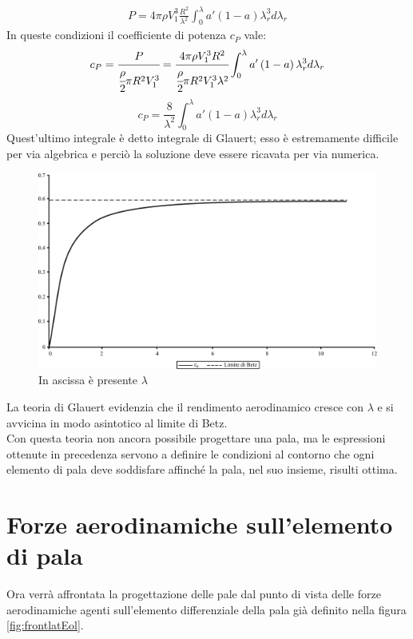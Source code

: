 \begin{align*}
P = 4 \pi \rho V_1^3 \frac{R^2}{\lambda^2} \int_0^{\lambda} a' \left( 1 - a \right) \lambda_r^3 d \lambda_r
\end{align*}
In queste condizioni il coefficiente di potenza $c_P$ vale:
\begin{align*}
c_P = \cfrac{P}{\cfrac{\rho}{2} \pi R^2 V_1^3} = \cfrac{4 \pi \rho V_1^3 R^2}{\cfrac{\rho}{2} \pi R^2  V_1^3 \lambda^2} \int_0^{\lambda} a' \left(1 - a \right) \lambda_r^3 d \lambda_r
\end{align*}
\begin{equation}
c_P = \frac{8}{\lambda^2} \int_0^{\lambda} a' \left( 1 - a \right) \lambda_r^3 d \lambda_r
\end{equation}
Quest'ultimo integrale è detto integrale di Glauert; esso è estremamente difficile per via algebrica e perciò la soluzione deve essere ricavata per via numerica.
\begin{figure}[h!]
\centering
  \includegraphics[width=.7\textwidth]{fig/limBetz.pdf}
\caption{In ascissa è presente $\lambda$}
\label{fig:limBetz}
\end{figure}
La teoria di Glauert evidenzia che il rendimento aerodinamico cresce con $\lambda$ e si avvicina in modo asintotico al limite di Betz. \\
Con questa teoria non ancora possibile progettare una pala, ma le espressioni ottenute in precedenza servono a definire le condizioni al contorno che ogni elemento di pala deve soddisfare affinché la pala, nel suo insieme, risulti ottima.

\section{Forze aerodinamiche sull'elemento di pala}
Ora verrà affrontata la progettazione delle pale dal punto di vista delle forze aerodinamiche agenti sull'elemento differenziale della pala già definito nella figura \ref{fig:frontlatEol}. 

